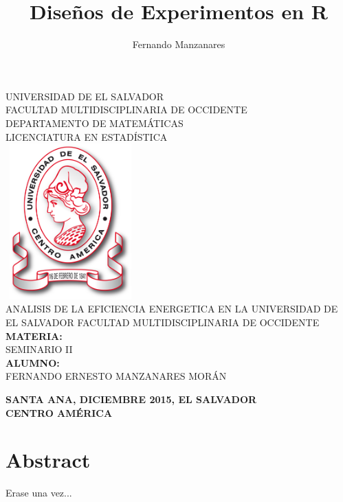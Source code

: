\documentclass[12pt,letterpaper]{report}
\author{Fernando Manzanares}
\title{Diseños de Experimentos en R}
\begin{document}


\doublespacing
\thispagestyle{empty}

\begin{center}
UNIVERSIDAD DE EL SALVADOR \\ FACULTAD MULTIDISCIPLINARIA DE OCCIDENTE \\ DEPARTAMENTO DE MATEMÁTICAS \\
LICENCIATURA EN ESTADÍSTICA\\
\bigskip
\includegraphics [width=5cm,height=6cm]{Minerva}
\bigskip
\\ ANALISIS DE LA EFICIENCIA ENERGETICA EN LA UNIVERSIDAD DE EL SALVADOR FACULTAD MULTIDISCIPLINARIA DE OCCIDENTE \\
\bigskip
\textbf{MATERIA:}\\ 
SEMINARIO II\\
\textbf{ALUMNO:}\\ 
FERNANDO ERNESTO MANZANARES MORÁN\\
\bigskip
\bigskip
\bigskip
\bigskip
\bigskip
\bigskip

\textbf{SANTA ANA,    DICIEMBRE 2015,   EL SALVADOR}\\
\textbf{CENTRO AMÉRICA}\\


\end{center}


\tableofcontents 
\chapter*{Abstract}
Erase una vez...
\vspace{-2cm}
\end{document}
